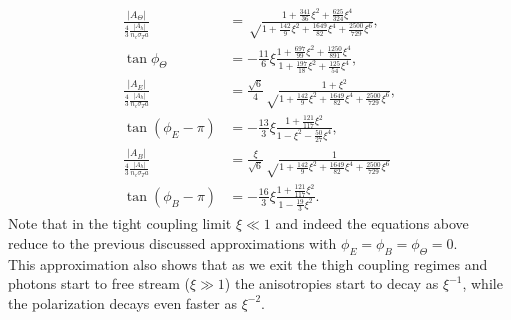 \begin{subequations}\label{eq:improved_TightCouplingApproximation}
    \begin{align}
        \frac{|A_\Theta|}{\frac{4}{3}\frac{|A_h|}{n_e\sigma_T a}}&=\sqrt\frac{1+\frac{341}{36}\xi^2+\frac{625}{324}\xi^4}{1+\frac{142}{9}\xi^2+\frac{1649}{82}\xi^4+\frac{2500}{729}\xi^6},\nonumber\\\tan\phi_\Theta&=-\frac{11}{6}\xi\frac{1+\frac{697}{99}\xi^2+\frac{1250}{891}\xi^4}{1+\frac{197}{18}\xi^2+\frac{125}{54}\xi^4},\\
        \frac{|A_E|}{\frac{4}{3}\frac{|A_h|}{n_e\sigma_T a}}&=\frac{\sqrt 6}{4}\sqrt\frac{1+\xi^2}{1+\frac{142}{9}\xi^2+\frac{1649}{82}\xi^4+\frac{2500}{729}\xi^6},\nonumber\\\tan(\phi_E-\pi)&=-\frac{13}{3}\xi\frac{1+\frac{121}{117}\xi^2}{1-\xi^2-\frac{50}{27}\xi^4},\\
        \frac{|A_B|}{\frac{4}{3}\frac{|A_h|}{n_e\sigma_T a}}&=\frac{\xi}{\sqrt 6}\sqrt\frac{1}{1+\frac{142}{9}\xi^2+\frac{1649}{82}\xi^4+\frac{2500}{729}\xi^6}\nonumber\\\tan(\phi_B-\pi)&=-\frac{16}{3}\xi\frac{1+\frac{121}{117}\xi^2}{1-\frac{19}{3}\xi^2}.
    \end{align}
\end{subequations}
Note that in the tight coupling limit $\xi\ll1$ and indeed the equations above reduce to the previous discussed approximations with $\phi_E=\phi_B=\phi_\Theta=0$.\\ This approximation also shows that as we exit the thigh coupling regimes and photons start to free stream ($\xi\gg1$) the anisotropies start to decay  as $\xi^{-1}$, while the polarization decays even faster as $\xi^{-2}$.\\